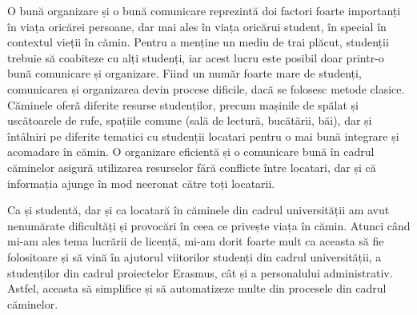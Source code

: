 \documentclass[12pt,a4paper]{report}
\theoremstyle{definition}
\theoremstyle{remark}
\begin{document}
\par O bună organizare și o bună comunicare reprezintă doi factori foarte importanți în viața oricărei persoane, dar mai ales în viața oricărui student, în special în contextul vieții în cămin. Pentru a menține un mediu de trai plăcut, studenții trebuie să coabiteze cu alți studenți, iar acest lucru este posibil doar printr-o bună comunicare și organizare. Fiind un număr foarte mare de studenți, comunicarea și organizarea devin procese dificile, dacă se folosesc metode clasice. Căminele oferă diferite resurse studenților, precum mașinile de spălat și uscătoarele de rufe, spațiile comune (sală de lectură, bucătării, băi), dar și întâlniri pe diferite tematici cu studenții locatari pentru o mai bună integrare și acomadare în cămin. O organizare eficientă și o comunicare bună în cadrul căminelor asigură  utilizarea resurselor fără conflicte între locatari, dar și că informația ajunge în mod neeronat către toți locatarii.

\par Ca și studentă, dar și ca locatară în căminele din cadrul universității am avut nenumărate dificultăți și provocări în ceea ce privește viața în cămin. Atunci când mi-am ales tema lucrării de licență, mi-am dorit foarte mult ca aceasta să fie folositoare și să vină în ajutorul viitorilor studenți din cadrul universității, a studenților din cadrul proiectelor Erasmus, cât și a personalului administrativ. Astfel, aceasta să simplifice și să automatizeze multe din procesele din cadrul căminelor.
\end{document}
